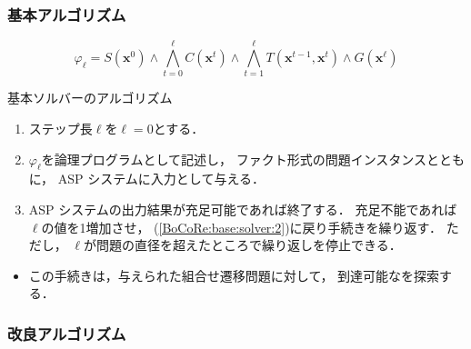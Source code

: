 \documentclass[dvipdfmx,11pt]{beamer}
\begin{document}
\begin{frame}
  \frametitle{基本アルゴリズム}

  \[
    \varphi_{\ell} = S(\bm{x}^0)  
    \land \bigwedge_{t=0}^{\ell} C(\bm{x}^t) 
    \land \bigwedge_{t=1}^{\ell} T(\bm{x}^{t-1},\bm{x}^{t}) 
    \land G(\bm{x}^\ell)  
  \]

\begin{block}{基本ソルバーのアルゴリズム}
\begin{enumerate}
\item ステップ長$\ell$を$\ell=0$とする．
\item \label{BoCoRe:base:solver:2}
  $\varphi_\ell$を論理プログラムとして記述し，
  ファクト形式の問題インスタンスとともに，
  ASP システムに入力として与える．
\item ASP システムの出力結果が充足可能であれば終了する．
  充足不能であれば$\ell$の値を1増加させ，
  (\ref{BoCoRe:base:solver:2})に戻り手続きを繰り返す．
  ただし，
  $\ell$が問題の直径を超えたところで繰り返しを停止できる．
\end{enumerate}
\end{block}

\begin{itemize}
\item この手続きは，与えられた組合せ遷移問題に対して，
  到達可能なを探索する．
\end{itemize}
\end{frame}
\begin{frame}
  \frametitle{改良アルゴリズム}

\end{frame}
\end{document}
